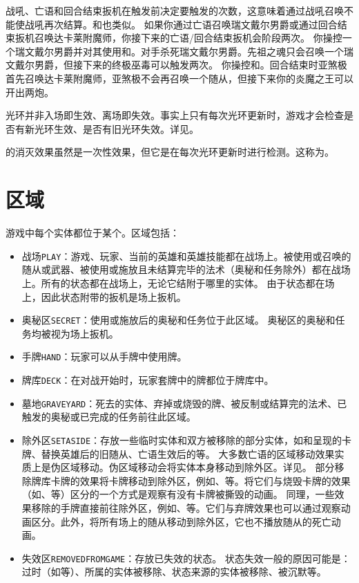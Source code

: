 战吼、亡语和回合结束扳机在触发前决定要触发的次数，这意味着通过战吼召唤不能使战吼再次结算。和也类似。
\notice 如果你通过亡语召唤瑞文戴尔男爵或通过回合结束扳机召唤达卡莱附魔师，你接下来的亡语/回合结束扳机会阶段两次。
\example 你操控一个瑞文戴尔男爵并对其使用和。对手杀死瑞文戴尔男爵。先祖之魂只会召唤一个瑞文戴尔男爵，但接下来的终极巫毒可以触发两次。
\example 你操控和。回合结束时亚煞极首先召唤达卡莱附魔师，亚煞极不会再召唤一个随从，但接下来你的炎魔之王可以开出两炮。

光环并非入场即生效、离场即失效。事实上只有每次光环更新时，游戏才会检查是否有新光环生效、是否有旧光环失效。详见。

的消灭效果虽然是一次性效果，但它是在每次光环更新时进行检测。这称为。

\section{区域}
\label{zone}

游戏中每个实体都位于某个。区域包括：

\begin{itemize}[itemsep=\parsep]
    \item 战场\texttt{PLAY}：游戏、玩家、当前的英雄和英雄技能都在战场上。被使用或召唤的随从或武器、被使用或施放且未结算完毕的法术（奥秘和任务除外）都在战场上。所有的状态都在战场上，无论它结附于哪里的实体。
        \notice 由于状态都在场上，因此状态附带的扳机是场上扳机。
    \item 奥秘区\texttt{SECRET}：使用或施放后的奥秘和任务位于此区域。
        \notice 奥秘区的奥秘和任务均被视为场上扳机。
    \item 手牌\texttt{HAND}：玩家可以从手牌中使用牌。
    \item 牌库\texttt{DECK}：在对战开始时，玩家套牌中的牌都位于牌库中。
    \item 墓地\texttt{GRAVEYARD}：死去的实体、弃掉或烧毁的牌、被反制或结算完的法术、已触发的奥秘或已完成的任务前往此区域。
    \item 除外区\texttt{SETASIDE}：存放一些临时实体和双方被移除的部分实体，如和呈现的卡牌、替换英雄后的旧随从、亡语生效后的等。
        \notice 大多数亡语的区域移动效果实质上是伪区域移动。伪区域移动会将实体本身移动到除外区。详见。
        \notice 部分移除牌库卡牌的效果将卡牌移动到除外区，例如、等。将它们与烧毁卡牌的效果（如、等）区分的一个方式是观察有没有卡牌被撕毁的动画。
        \notice 同理，一些效果移除的手牌直接前往除外区，例如、等。它们与弃牌效果也可以通过观察动画区分。此外，将所有场上的随从移动到除外区，它也不播放随从的死亡动画。
    \item 失效区\texttt{REMOVEDFROMGAME}：存放已失效的状态。
        \notice 状态失效一般的原因可能是：过时（如等）、所属的实体被移除、状态来源的实体被移除、被沉默等。
\end{itemize}

